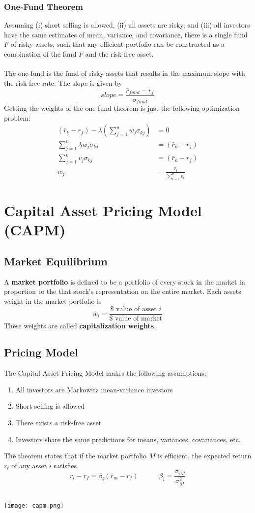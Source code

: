 \documentclass[11pt]{article}
\begin{document}
\subsubsection{One-Fund Theorem}
Assuming (i) short selling is allowed, (ii) all assets are risky, and (iii) all investors have the same estimates of mean, variance, and covariance,  there is a single fund $F$ of risky assets, such that any efficient portfolio can be constructed as a combination of the fund $F$ and the risk free asset.  \\ \\ The one-fund is the fund of risky assets that results in the maximum slope with the risk-free rate.  The slope is given by 
$$ slope =  \frac{ \bar{r}_{fund} - r_f}{\sigma_{fund}}$$
Getting the weights of the one fund theorem is just the following optimization problem:
\begin{align*}
(\bar{r}_k - r_f) - \lambda \left( \sum_{j=1}^n w_j \sigma_{kj} \right) &= 0  \\
 \sum_{j=1}^n \lambda w_j \sigma_{kj}  &= (\bar{r}_k - r_f) \\
 \sum_{j=1}^n v_j \sigma_{kj}  &= (\bar{r}_k - r_f)  \\
 w_j &= \frac{v_j}{\sum_{i=1}^n v_i}
\end{align*}

\pagebreak
\section{Capital Asset Pricing Model (CAPM)}
\subsection{Market Equilibrium}
A \textbf{market portfolio} is defined to be a portfolio of every stock in the market in proportion to the that stock's representation on the entire market.  Each assets weight in the market portfolio is 
$$ w_i = \frac{\$ \text{ value of asset } i}{\$ \text{ value of market}}$$
These weights are called \textbf{capitalization weights}.

\subsection{Pricing Model}
The Capital Asset Pricing Model makes the following assumptions:
\begin{enumerate}
\item All investors are Markowitz mean-variance investors
\item Short selling is allowed
\item There exists a risk-free asset 
\item Investors share the same predictions for means, variances, covariances, etc.
\end{enumerate}
The theorem states that if the market portfolio $M$ is efficient, the expected return $r_i$ of any asset $i$ satisfies 
$$ r_i - r_f = \beta_i (\bar{r}_m - r_f) \quad \quad \quad \beta_i = \frac{\sigma_{iM}}{\sigma^2_M}$$  
\\ 
\begin{center}
\texttt{[image: capm.png]} 
\end{center}
\end{document}
